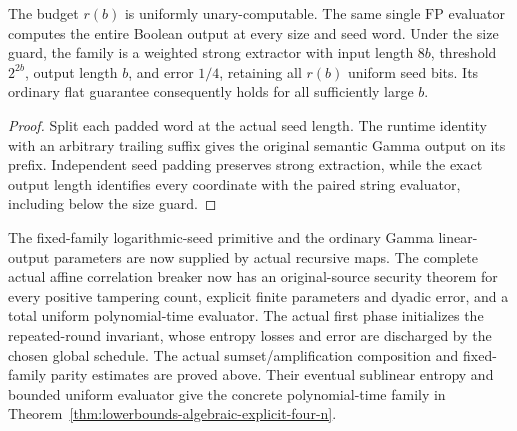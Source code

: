 \begin{theorem}
  \label{thm:lowerbounds-algebraic-gamma-padded}
  \leanok
  The budget $r(b)$ is uniformly unary-computable. The same single
  $\mathrm{FP}$ evaluator computes the entire Boolean output at every
  size and seed word. Under the size guard, the family is a weighted
  strong extractor with input length $8b$, threshold $2^{2b}$, output
  length $b$, and error $1/4$, retaining all $r(b)$ uniform seed bits.
  Its ordinary flat guarantee consequently holds for all sufficiently
  large $b$.
\end{theorem}
\begin{proof}
  \leanok
  Split each padded word at the actual seed length. The runtime identity
  with an arbitrary trailing suffix gives the original semantic Gamma
  output on its prefix. Independent seed padding preserves strong
  extraction, while the exact output length identifies every coordinate
  with the paired string evaluator, including below the size guard.
\end{proof}

The fixed-family logarithmic-seed primitive and the ordinary Gamma
linear-output parameters are now supplied by actual recursive maps.
The complete actual affine correlation breaker now has an original-source
security theorem for every positive tampering count, explicit finite
parameters and dyadic error, and a total uniform polynomial-time evaluator.
The actual first phase initializes the repeated-round invariant, whose
entropy losses and error are discharged by the chosen global schedule.
The actual sumset/amplification composition and fixed-family parity estimates
are proved above. Their eventual sublinear entropy and bounded uniform evaluator
give the concrete polynomial-time family in
Theorem~\ref{thm:lowerbounds-algebraic-explicit-four-n}.

